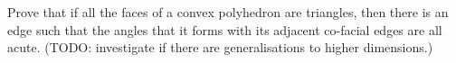Prove that if all the faces of a convex polyhedron are triangles,
then there is an edge such that the angles that it forms with its adjacent co-facial edges are all acute.
\newline (TODO: investigate if there are generalisations to higher dimensions.)
